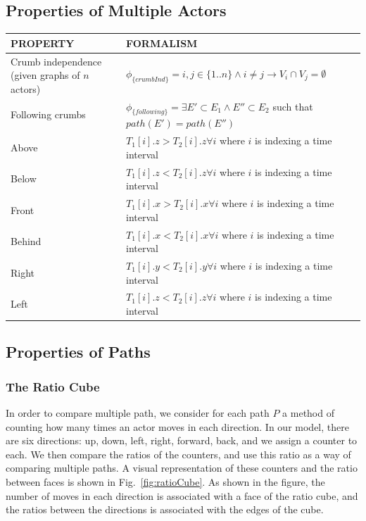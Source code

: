 \subsection{Properties of Multiple Actors}
\begin{tabular}{| p{2.8cm} | p{11.5cm} | }
\hline
PROPERTY & FORMALISM \\ \hline
 Crumb independence (given graphs of $n$ actors)& $\phi_{\{crumbInd\}} =  i,j \in \{1..n\} \land i \neq j \rightarrow V_i \cap V_j = \emptyset $ \\ \hline
 Following crumbs & $\phi_{\{following\}} =  \exists E' \subset E_1 \land E'' \subset E_2$ such that $path(E')=path(E'') $  \\ \hline
 Above & $T_1[i].z > T_2[i].z \forall i$ where $i$ is indexing a time interval\\ \hline
 Below & $T_1[i].z < T_2[i].z \forall i$ where $i$ is indexing a time interval\\ \hline
 Front & $T_1[i].x > T_2[i].x \forall i$ where $i$ is indexing a time interval\\ \hline
 Behind & $T_1[i].x < T_2[i].x \forall i$ where $i$ is indexing a time interval\\ \hline
 Right & $T_1[i].y < T_2[i].y \forall i$ where $i$ is indexing a time interval \\ \hline
 Left & $T_1[i].z < T_2[i].z \forall i$ where $i$ is indexing a time interval \\ \hline
\end{tabular}


\subsection{Properties of Paths}
\subsubsection{The Ratio Cube}

In order to compare multiple path, we consider for each path $P$ a method of counting how many times an actor moves in each direction.  
In our model, there are six directions: up, down, left, right, forward, back, and we assign a counter to each.
We then compare the ratios of the counters, and use this ratio as a way of comparing multiple paths.
A visual representation of these counters and the ratio between faces is shown in Fig.~\ref{fig:ratioCube}.
As shown in the figure, the number of moves in each direction is associated with a face of the ratio cube, and the ratios between the directions is associated with the edges of the cube.


